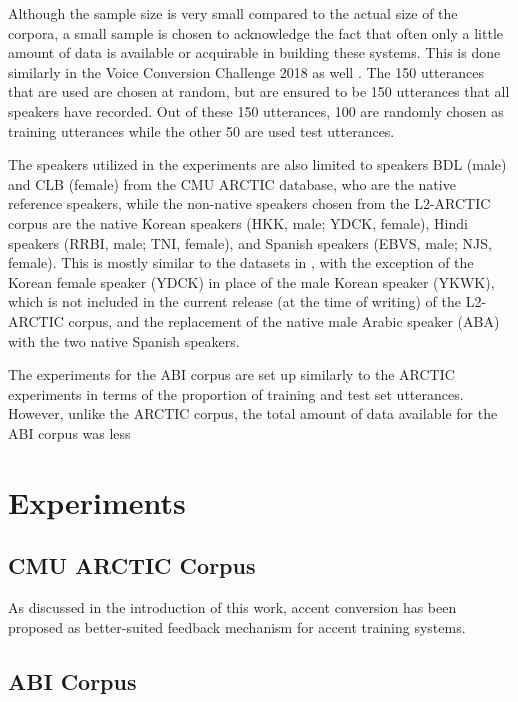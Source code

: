 \documentclass
[
    a4paper,
    twoside,
    12pt,
]
{report}
\begin{document}
Although the sample size is very small compared to the actual size of
the corpora, a small sample is chosen to acknowledge the fact that often
only a little amount of data is available or acquirable in building
these systems. This is done similarly in the Voice Conversion Challenge
2018 as well \cite{lorenzo-trueba2018}. The 150 utterances that are used
are chosen at random, but are ensured to be 150 utterances that all
speakers have recorded. Out of these 150 utterances, 100 are randomly
chosen as training utterances while the other 50 are used test
utterances.

The speakers utilized in the experiments are also limited to speakers
BDL (male) and CLB (female) from the CMU ARCTIC database, who are the
native reference speakers, while the non-native speakers chosen from the
L2-ARCTIC corpus are the native Korean speakers (HKK, male; YDCK,
female), Hindi speakers (RRBI, male; TNI, female), and Spanish speakers
(EBVS, male; NJS, female). This is mostly similar to the datasets in
\textcite{zhao2018a}, with the exception of the Korean female speaker
(YDCK) in place of the male Korean speaker (YKWK), which is not included
in the current release (at the time of writing) of the L2-ARCTIC corpus,
and the replacement of the native male Arabic speaker (ABA) with the two
native Spanish speakers.

The experiments for the ABI corpus are set up similarly to the ARCTIC
experiments in terms of the proportion of training and test set
utterances. However, unlike the ARCTIC corpus, the total amount of data
available for the ABI corpus was less

\hypertarget{experiments}{%
\section{Experiments}\label{experiments}}

\hypertarget{cmu-arctic-corpus-1}{%
\subsection{CMU ARCTIC Corpus}\label{cmu-arctic-corpus-1}}

As discussed in the introduction of this work, accent conversion has
been proposed as better-suited feedback mechanism for accent training
systems.

\hypertarget{abi-corpus}{%
\subsection{ABI Corpus}\label{abi-corpus}}
\end{document}
